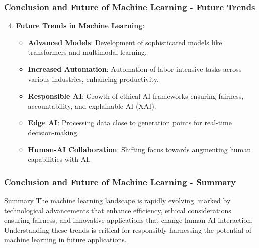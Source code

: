 \documentclass[aspectratio=169]{beamer}
\begin{document}
\begin{frame}[fragile]
  \frametitle{Conclusion and Future of Machine Learning - Future Trends}
  \begin{enumerate}
    \setcounter{enumi}{3}
    \item \textbf{Future Trends in Machine Learning}:
    \begin{itemize}
      \item \textbf{Advanced Models}: Development of sophisticated models like transformers and multimodal learning.
      \item \textbf{Increased Automation}: Automation of labor-intensive tasks across various industries, enhancing productivity.
      \item \textbf{Responsible AI}: Growth of ethical AI frameworks ensuring fairness, accountability, and explainable AI (XAI).
      \item \textbf{Edge AI}: Processing data close to generation points for real-time decision-making.
      \item \textbf{Human-AI Collaboration}: Shifting focus towards augmenting human capabilities with AI.
    \end{itemize}
  \end{enumerate}
\end{frame}

\begin{frame}[fragile]
  \frametitle{Conclusion and Future of Machine Learning - Summary}
  \begin{block}{Summary}
    The machine learning landscape is rapidly evolving, marked by technological advancements that enhance efficiency, ethical considerations ensuring fairness, and innovative applications that change human-AI interaction.
    \vspace{0.5cm}
    Understanding these trends is critical for responsibly harnessing the potential of machine learning in future applications.
  \end{block}
\end{frame}
\end{document}
